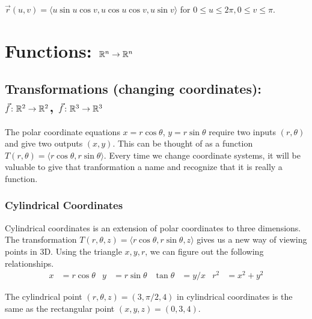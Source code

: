 $\vec r(u,v)=\langle u\sin u \cos v , u\cos u \cos v , u\sin v \rangle$ for $0\leq u\leq 2 \pi,0\leq v\leq \pi$.


\section{Functions: $\mathbb{R}^n\to \mathbb{R}^n$}

\subsection{Transformations (changing coordinates): {$\vec f\colon \mathbb{R}^2\to \mathbb{R}^2$}, {$\vec f\colon \mathbb{R}^3\to \mathbb{R}^3$}}

The polar coordinate equations $x=r\cos\theta$, $y=r\sin\theta$
require two inputs $(r,\theta)$ and give two outputs $(x,y)$.  This can
be thought of as a function $T(r,\theta)=\langle
r\cos\theta,r\sin\theta\rangle$. Every time we change coordinate
systems, it will be valuable to give that tranformation a name and
recognize that it is really a function.


\subsubsection{Cylindrical Coordinates}
Cylindrical coordinates is an extension of polar coordinates to three
dimensions.  The transformation $T(r,\theta,z) = \langle
r\cos\theta,r\sin\theta,z\rangle$ gives us a new way of viewing points
in 3D.  Using the triangle $x,y,r$, we can figure out the following
relationships.
\begin{align*}
  x&=r \cos \theta & 
  y&=r \sin \theta & 
  \tan\theta&=y/x & 
  r^2&=x^2+y^2     
\end{align*}

\examplebegin
The cylindrical point {$(r, \theta, z)=(3,\pi/2,4)$} in
cylindrical coordinates is the same as the rectangular point $(x,y,z)
= (0,3,4)$.
\exampleend

